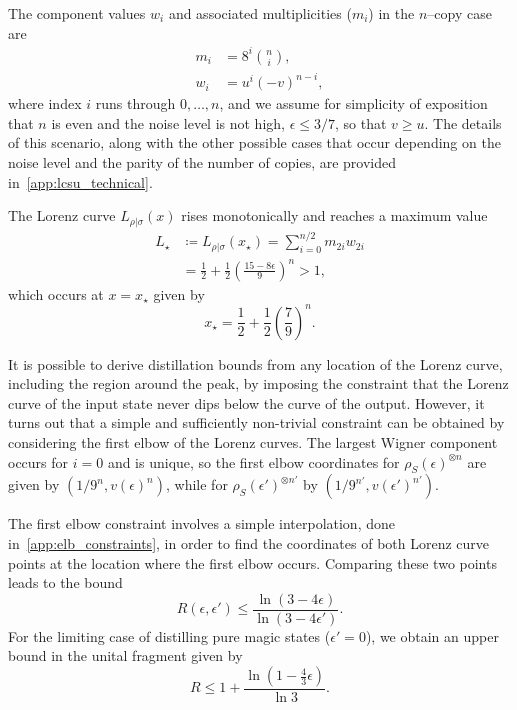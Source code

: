 \documentclass[pra,
aps,
twocolumn,
superscriptaddress,
groupedaddress,
nofootinbib,
reprint
]{revtex4-1}
\begin{document}
The component values $w_i$ and associated multiplicities ($m_i$) in the $n$--copy case are 
\begin{align}
	m_i &= 8^{i}\binom{n}{i}, \\
	w_i &= u^{i}(-v)^{n-i}, \label{eq:wigu}
\end{align}
where index $i$ runs through $0, \dots, n$, and we assume for simplicity of exposition that $n$ is even and the noise level is not high, $\epsilon \leq 3/7$, so that $v \geq u$.
The details of this scenario, along with the other possible cases that occur depending on the noise level and the parity of the number of copies, are provided in~\cref{app:lcsu_technical}.

The Lorenz curve $L_{\rho|\sigma}(x)$ rises monotonically and reaches a maximum value
\begin{align}\label{eq:lcsu_max}
	L_\star &\coloneqq L_{\rho |\sigma} (x_\star) = \sum_{i = 0}^{n/2} m_{2i} w_{2i} \nonumber\\
	&= \frac{1}{2} + \frac{1}{2}\left(\frac{15 - 8\epsilon}{9}\right)^n > 1,
\end{align}
which occurs at $x=x_\star$ given by
\begin{equation}
	x_\star = \frac{1}{2} + \frac{1}{2}\left(\frac{7}{9}\right)^n.
\end{equation}

It is possible to derive distillation bounds from any location of the Lorenz curve, including the region around the peak, by imposing the constraint that the Lorenz curve of the input state never dips below the curve of the output.
However, it turns out that a simple and sufficiently non-trivial constraint can be obtained by considering the first elbow of the Lorenz curves. 
The largest Wigner component occurs for $i=0$ and is unique, so the first elbow coordinates for $\rho_S(\epsilon)^{\otimes n}$ are given by $(1/9^n, v(\epsilon)^n)$, while for $\rho_S(\epsilon')^{\otimes n'}$ by $(1/9^{n'}, v(\epsilon')^{n'})$.

The first elbow constraint involves a simple interpolation, done in~\cref{app:elb_constraints}, in order to find the coordinates of both Lorenz curve points at the location where the first elbow occurs. 
Comparing these two points leads to the bound
\begin{equation}
	R(\epsilon, \epsilon') \leq \frac{\ln{(3-4\epsilon)}}{\ln{(3-4\epsilon')}}.
\end{equation}
For the limiting case of distilling pure magic states ($\epsilon'=0$), we obtain an upper bound in the unital fragment given by
\begin{equation}
	R \leq 1 + \frac{\ln (1 - \frac{4}{3} \epsilon)}{\ln 3}.
\end{equation}
\end{document}
